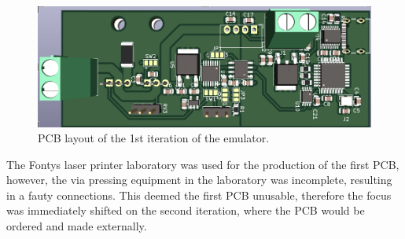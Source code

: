 \begin{figure}[h]
    \centering
    \includegraphics[scale=0.45]{pcb_1st_iteration.png}
    \caption{PCB layout of the 1st iteration of the emulator.}
\end{figure}


The Fontys laser
printer laboratory was used for the production of the first PCB, however, the via pressing
equipment in the laboratory was incomplete, resulting in a fauty connections. This 
deemed the first PCB unusable, therefore the focus was immediately shifted on the 
second iteration, where the PCB would be ordered and made externally.
